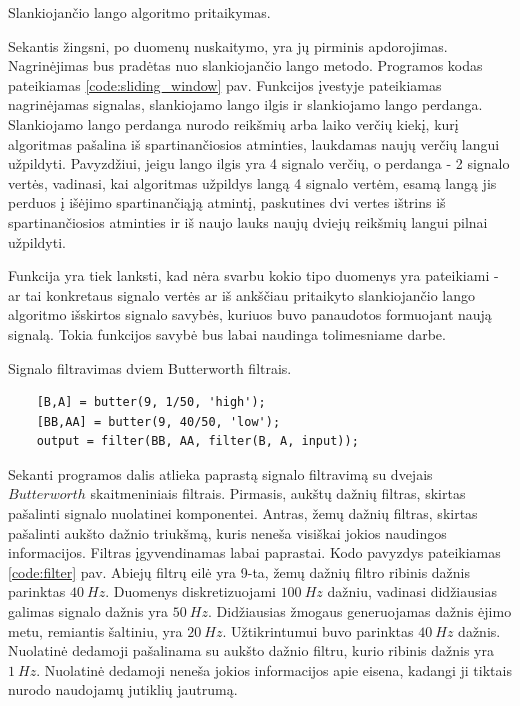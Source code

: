 \documentclass[]{vgtuef}
\begin{document}
\begin{cfigure}
  \centering
  \caption{Slankiojančio lango algoritmo pritaikymas.}
  \label{code:sliding_window}
  
\end{cfigure}

Sekantis žingsni, po duomenų nuskaitymo, yra jų pirminis apdorojimas. Nagrinėjimas bus pradėtas nuo slankiojančio lango metodo. Programos kodas pateikiamas \ref{code:sliding_window} pav. Funkcijos įvestyje pateikiamas nagrinėjamas signalas, slankiojamo lango ilgis ir slankiojamo lango perdanga. Slankiojamo lango perdanga nurodo reikšmių arba laiko verčių kiekį, kurį algoritmas pašalina iš spartinančiosios atminties, laukdamas naujų verčių langui užpildyti. Pavyzdžiui, jeigu lango ilgis yra 4 signalo verčių, o perdanga - 2 signalo vertės, vadinasi, kai algoritmas užpildys langą 4 signalo vertėm, esamą langą jis perduos į išėjimo spartinančiąją atmintį, paskutines dvi vertes ištrins iš spartinančiosios atminties ir iš naujo lauks naujų dviejų reikšmių langui pilnai užpildyti.

Funkcija yra tiek lanksti, kad nėra svarbu kokio tipo duomenys yra pateikiami - ar tai konkretaus signalo vertės ar iš ankščiau pritaikyto slankiojančio lango algoritmo išskirtos signalo savybės, kuriuos buvo panaudotos formuojant naują signalą. Tokia funkcijos savybė bus labai naudinga tolimesniame darbe.

\begin{cfigure}
  \centering
  \caption{Signalo filtravimas dviem Butterworth filtrais.}
  \label{code:filter}
  \begin{lstlisting}
    [B,A] = butter(9, 1/50, 'high');
    [BB,AA] = butter(9, 40/50, 'low');
    output = filter(BB, AA, filter(B, A, input));
  \end{lstlisting}
\end{cfigure}

Sekanti programos dalis atlieka paprastą signalo filtravimą su dvejais $Butterworth$ skaitmeniniais filtrais. Pirmasis, aukštų dažnių filtras, skirtas pašalinti signalo nuolatinei komponentei. Antras, žemų dažnių filtras, skirtas pašalinti aukšto dažnio triukšmą, kuris neneša visiškai jokios naudingos informacijos. Filtras įgyvendinamas labai paprastai. Kodo pavyzdys pateikiamas \ref{code:filter} pav. Abiejų filtrų eilė yra 9-ta, žemų dažnių filtro ribinis dažnis parinktas $40~Hz$. Duomenys diskretizuojami $100~Hz$ dažniu, vadinasi didžiausias galimas signalo dažnis yra $50~Hz$. Didžiausias žmogaus generuojamas dažnis ėjimo metu, remiantis šaltiniu, yra $20~Hz$. Užtikrintumui buvo parinktas $40~Hz$ dažnis. Nuolatinė dedamoji pašalinama su aukšto dažnio filtru, kurio ribinis dažnis yra $1~Hz$. Nuolatinė dedamoji neneša jokios informacijos apie eisena, kadangi ji tiktais nurodo naudojamų jutiklių jautrumą.
\end{document}
